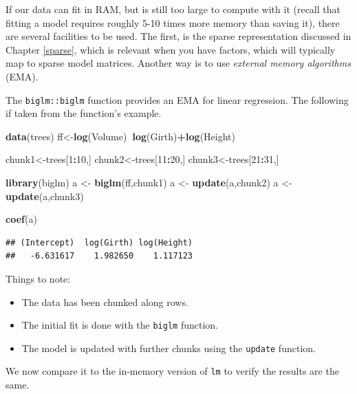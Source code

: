 \documentclass[]{book}
\newenvironment{Shaded}{\begin{snugshade}}{\end{snugshade}}
\newcommand{\KeywordTok}[1]{\textcolor[rgb]{0.13,0.29,0.53}{\textbf{#1}}}
\newcommand{\DecValTok}[1]{\textcolor[rgb]{0.00,0.00,0.81}{#1}}
\newcommand{\StringTok}[1]{\textcolor[rgb]{0.31,0.60,0.02}{#1}}
\newcommand{\OperatorTok}[1]{\textcolor[rgb]{0.81,0.36,0.00}{\textbf{#1}}}
\newcommand{\NormalTok}[1]{#1}
\providecommand{\tightlist}{%
  \setlength{\itemsep}{0pt}\setlength{\parskip}{0pt}}
\theoremstyle{definition}
\theoremstyle{definition}
\theoremstyle{definition}
\theoremstyle{remark}
\begin{document}
If our data can fit in RAM, but is still too large to compute with it
(recall that fitting a model requires roughly 5-10 times more memory
than saving it), there are several facilities to be used. The first, is
the sparse representation discussed in Chapter \ref{sparse}, which is
relevant when you have factors, which will typically map to sparse model
matrices. Another way is to use \emph{external memory algorithms} (EMA).

The \texttt{biglm::biglm} function provides an EMA for linear
regression. The following if taken from the function's example.

\begin{Shaded}
\begin{Highlighting}[]
\KeywordTok{data}\NormalTok{(trees)}
\NormalTok{ff<-}\KeywordTok{log}\NormalTok{(Volume)}\OperatorTok{~}\KeywordTok{log}\NormalTok{(Girth)}\OperatorTok{+}\KeywordTok{log}\NormalTok{(Height)}

\NormalTok{chunk1<-trees[}\DecValTok{1}\OperatorTok{:}\DecValTok{10}\NormalTok{,]}
\NormalTok{chunk2<-trees[}\DecValTok{11}\OperatorTok{:}\DecValTok{20}\NormalTok{,]}
\NormalTok{chunk3<-trees[}\DecValTok{21}\OperatorTok{:}\DecValTok{31}\NormalTok{,]}

\KeywordTok{library}\NormalTok{(biglm)}
\NormalTok{a <-}\StringTok{ }\KeywordTok{biglm}\NormalTok{(ff,chunk1)}
\NormalTok{a <-}\StringTok{ }\KeywordTok{update}\NormalTok{(a,chunk2)}
\NormalTok{a <-}\StringTok{ }\KeywordTok{update}\NormalTok{(a,chunk3)}

\KeywordTok{coef}\NormalTok{(a)}
\end{Highlighting}
\end{Shaded}

\begin{verbatim}
## (Intercept)  log(Girth) log(Height) 
##   -6.631617    1.982650    1.117123
\end{verbatim}

Things to note:

\begin{itemize}
\tightlist
\item
  The data has been chunked along rows.
\item
  The initial fit is done with the \texttt{biglm} function.
\item
  The model is updated with further chunks using the \texttt{update}
  function.
\end{itemize}

We now compare it to the in-memory version of \texttt{lm} to verify the
results are the same.
\end{document}
